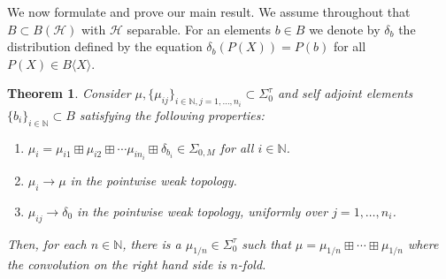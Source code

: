 \documentclass[11pt]{amsart}
\newtheorem{theorem}{Theorem}[section]
\begin{document}
We now formulate and prove our main result.  We assume throughout that $B \subset B(\mathcal{H})$ with $\mathcal{H}$ separable.
For an elements $b\in B$ we denote by $\delta_{b}$ the distribution defined by the equation $\delta_{b}(P(X)) = P(b)$ for all $P(X) \in B\langle X \rangle$.

\begin{theorem}\label{mainresult}
Consider  $\mu, \{\mu_{ij} \}_{i\in \mathbb{N}, j=1,\ldots,n_{i}} \subset \Sigma_{0}^{\tau}$ and self adjoint elements $\{b_{i} \}_{i\in \mathbb{N}} \subset B$
satisfying the following properties:

\begin{enumerate}
 \item $\mu_{i} = \mu_{i1} \boxplus \mu_{i2} \boxplus \cdots \mu_{in_{i}} \boxplus \delta_{b_{i}} \in \Sigma_{0,M}$ for all $i\in \mathbb{N}$.
\item $\mu_{i} \rightarrow \mu$ in the pointwise weak topology.
\item $\mu_{ij} \rightarrow \delta_{0}$ in the pointwise weak topology, uniformly over $j=1,\ldots,n_{i}$.
\end{enumerate}
Then, for each $n \in \mathbb{N}$, there is a $\mu_{1/n} \in \Sigma_{0}^{\tau}$ such that $\mu = \mu_{1/n} \boxplus \cdots \boxplus \mu_{1/n}$ where the convolution
on the right hand side is $n$-fold.
\end{theorem}
\end{document}

